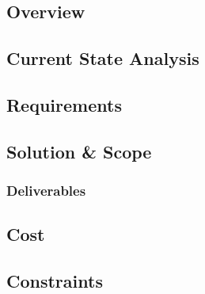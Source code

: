 \documentclass[letterpaper,12pt,2p]{elsarticle}
\begin{document}
\subsection{ Overview}%
\label{subsec1}%





\subsection{ Current State Analysis}
\label{subsec1}





\subsection{ Requirements}
\label{subsec1}





\subsection{ Solution \& Scope}
\label{subsec1}





\subsubsection{ Deliverables}
\label{subsec1}





\subsection{ Cost}
\label{subsec1}





\subsection{ Constraints}
\label{subsec1}
\end{document}
